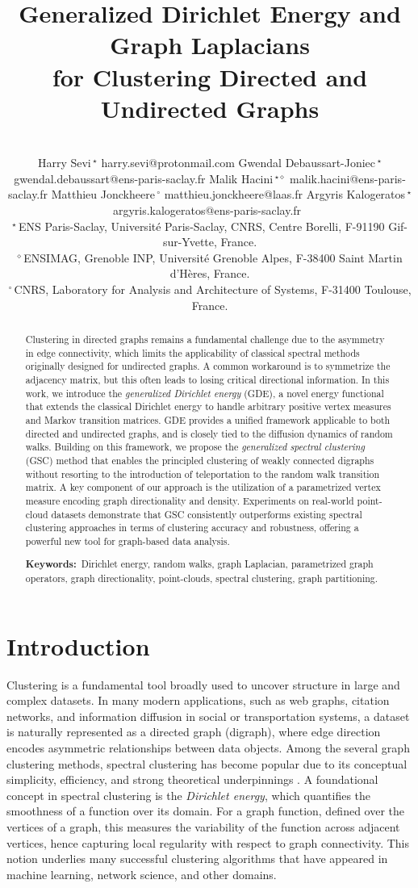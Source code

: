 \documentclass[10pt]{article} %
\title{Generalized Dirichlet Energy and Graph Laplacians \\for Clustering Directed and Undirected Graphs}
\author{\vspace{1em}\\
 \name Harry Sevi\,$^\star$ \email harry.sevi@protonmail.com
      \vspace{-.8em}
			\AND
			\name Gwendal Debaussart-Joniec\,$^\star$ \email gwendal.debaussart@ens-paris-saclay.fr
      \vspace{-.8em}
			\AND
      \name Malik Hacini\,$^{\star\diamond}$
			\email malik.hacini@ens-paris-saclay.fr
			\vspace{-.8em}
			\AND
      \name Matthieu Jonckheere\,$^\circ$ \email matthieu.jonckheere@laas.fr
			\vspace{-.8em}
			\AND
      \name Argyris Kalogeratos\,$^\star$  \email argyris.kalogeratos@ens-paris-saclay.fr\ \vspace{1em}\\
      \addr $^\star$\,ENS Paris-Saclay, Universit\'e Paris-Saclay, 			CNRS, Centre Borelli, F-91190 Gif-sur-Yvette, France. \\
			$^\diamond$\,ENSIMAG, Grenoble INP, Université Grenoble Alpes, F-38400 Saint Martin d'Hères, France.\\
			$^\circ$\,CNRS, Laboratory for Analysis and Architecture of Systems, F-31400 Toulouse, France.
}
\begin{document}
\maketitle
\begin{abstract}
Clustering in directed graphs remains a fundamental challenge due to the asymmetry in edge connectivity, which limits the applicability of classical spectral methods originally designed for undirected graphs. A common workaround is to symmetrize the adjacency matrix, but this often leads to losing critical directional information.
%
In this work, we introduce the \emph{generalized Dirichlet energy} (GDE), a novel energy functional that extends the classical Dirichlet energy to handle arbitrary positive vertex measures and Markov transition matrices. GDE provides a unified framework applicable to both directed and undirected graphs, and is closely tied to the diffusion dynamics of random walks.
%
Building on this framework, we propose the \emph{generalized spectral clustering} (GSC) method that enables the principled clustering of weakly connected digraphs without resorting to the introduction of teleportation to the random walk transition matrix. A key component of our approach is the utilization of a parametrized vertex measure encoding graph directionality and density. %
Experiments on real-world point-cloud datasets demonstrate that GSC consistently outperforms existing spectral clustering approaches in terms of clustering accuracy and robustness, offering a powerful new tool for graph-based data analysis.

\textbf{Keywords:}~Dirichlet energy, random walks, graph Laplacian, parametrized graph operators, graph directionality, point-clouds, spectral clustering, graph partitioning.
\end{abstract}

\section{Introduction} \label{sect:intro}
Clustering is a fundamental tool broadly used to uncover structure in large and complex datasets. In many modern applications, such as web graphs, citation networks, and information diffusion in social or transportation systems, a dataset is naturally represented as a directed graph (digraph), where edge direction encodes asymmetric relationships between data objects. Among the several graph clustering methods, spectral clustering has become popular due to its conceptual simplicity, efficiency, and strong theoretical underpinnings \citep{ng2002spectral, peng2015partitioning, boedihardjo2021performance}. A foundational concept in spectral clustering is the \emph{Dirichlet energy}, which quantifies the smoothness of a function over its domain. For a graph function, defined over the vertices of a graph, this measures the variability of the function across adjacent vertices, hence capturing local regularity with respect to graph connectivity. This notion underlies many successful clustering algorithms that have appeared in machine learning, network science, and other domains.
\end{document}
